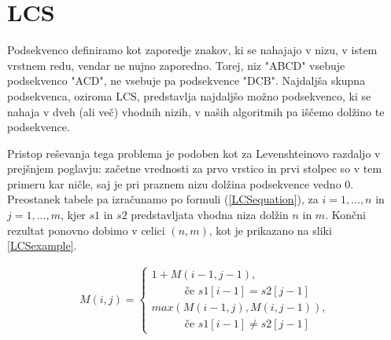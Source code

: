 \documentclass[a4paper,12pt,openright]{book}
\begin{document}
\section{LCS}

Podsekvenco definiramo kot zaporedje znakov, ki se nahajajo v nizu, v istem vrstnem redu, vendar ne nujno zaporedno. Torej, niz "ABCD" vsebuje podsekvenco "ACD", ne vsebuje pa podsekvence "DCB". Najdaljša skupna podsekvenca, oziroma LCS, predstavlja najdaljšo možno podsekvenco, ki se nahaja v dveh (ali več) vhodnih nizih, v naših algoritmih pa iščemo dolžino te podsekvence. 


Pristop reševanja tega problema je podoben kot za Levenshteinovo razdaljo v prejšnjem poglavju: začetne vrednosti za prvo vrstico in prvi stolpec so v tem primeru kar ničle, saj je pri praznem nizu dolžina podsekvence vedno 0. Preostanek tabele pa izračunamo po formuli (\ref{LCSequation}), za \begin{math}i=1,...,n\end{math} in \begin{math}j=1,...,m\end{math}, kjer \begin{math}s1\end{math} in \begin{math}s2\end{math} predstavljata vhodna niza dolžin \begin{math}n\end{math} in \begin{math}m\end{math}. Končni rezultat ponovno dobimo v celici \begin{math}(n, m)\end{math}, kot je prikazano na sliki \ref{LCSexample}. 

\begin{equation}
\label{LCSequation}
\begin{aligned}
M(i, j) = 
\begin{cases}
     1 + M(i-1, j-1) ,      \\ \quad \quad \quad\text{če } s1[i-1]=s2[j-1]\\
     max(M(i-1, j), M(i, j-1)) , \\ \quad \quad \quad \text{če } s1[i-1] \neq s2[j-1]
  \end{cases}
\end{aligned}
\end{equation}

\bigskip \bigskip
\end{document}

